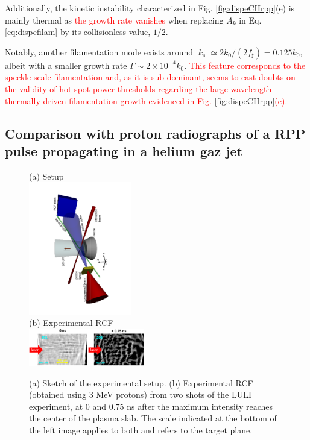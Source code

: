 \documentclass[
 reprint,
 superscriptaddress,
 amsmath,amssymb,
 aps,
]{revtex4-1}
\def\tc{\textcolor{red}}
\begin{document}
Additionally, the kinetic instability characterized in Fig. \ref{fig:dispeCHrpp}(e)  is mainly thermal as \tc{ the growth rate vanishes} when   replacing  $A_k$ in Eq. \eqref{eq:dispefilam} by its collisionless value, $1/2$. 

Notably, another filamentation mode exists around  $\vert k_s\vert \simeq 2k_0/(2f_\sharp) = 0.125k_0$, albeit with a smaller growth rate $\Gamma\sim 2\times 10^{-4}k_0 $. \tc{This feature corresponds to the speckle-scale filamentation and, as it is sub-dominant, seems to cast doubts on the validity of hot-spot power thresholds \cite[]{POF_Max_1976,POP_Williams_2006} regarding the large-wavelength thermally driven  filamentation growth evidenced in Fig.   \ref{fig:dispeCHrpp}(e).}

\subsection{Comparison with proton radiographs of a RPP pulse propagating in a helium gaz jet}\label{sec:xp}
\begin{figure}
(a) Setup \\
\includegraphics[width=0.4\textwidth,angle=-90]{set_up.pdf}\\
(b) Experimental RCF \\
\includegraphics[width=0.45\textwidth]{rcf.eps}
\caption{ \label{fig:xpfuchs_xp}  
(a) Sketch of the experimental setup.
(b) Experimental RCF (obtained using 3 MeV protons) from two shots of the LULI experiment, at $0$ and $0.75$ ns after the maximum intensity reaches the center of the plasma slab.  The scale indicated at the bottom of the left image applies to both and refers to the target plane. 
 }
\end{figure}
\end{document}
